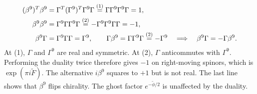 \begin{tcolorbox}[breakable]
\begin{remark}
\begin{align*}
(\beta^9)^T\beta^9 &= \Gamma^T(\Gamma^9)^T\Gamma^9\Gamma \overset{(1)}{=} \Gamma\Gamma^9\Gamma^9\Gamma = 1, \\
\beta^9\beta^9 &= \Gamma^9\Gamma\Gamma^9\Gamma \overset{(2)}{=} -\Gamma^9\Gamma^9\Gamma\Gamma = -1, \\
\beta^9\Gamma &= \Gamma^9\Gamma\Gamma = \Gamma^9, \qquad \Gamma\beta^9 = \Gamma\Gamma^9\Gamma \overset{(2)}{=} -\Gamma^9 \quad\Longrightarrow\quad \beta^9\Gamma = -\Gamma\beta^9 .
\end{align*}
At (1), $\Gamma$ and $\Gamma^9$ are real and symmetric. At (2), $\Gamma$ anticommutes with $\Gamma^9$. Performing the duality twice therefore gives $-1$ on right-moving spinors, which is $\exp(\pi i\tilde F)$. The alternative $i\beta^9$ squares to $+1$ but is not real. The last line shows that $\beta^9$ flips chirality. The ghost factor $e^{-\tilde\phi/2}$ is unaffected by the duality.


\end{remark}
\end{tcolorbox}
